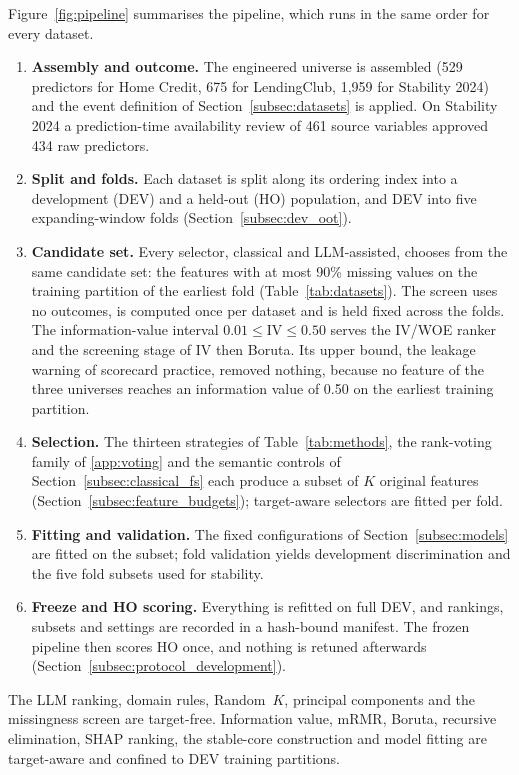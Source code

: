 \documentclass[final,5p,twocolumn]{elsarticle}
\newcommand{\Kfeat}{K}
\begin{document}
Figure~\ref{fig:pipeline} summarises the pipeline, which runs in the same order for every dataset.
\begin{enumerate}
    \item \textbf{Assembly and outcome.} The engineered universe is assembled (529 predictors for Home Credit, 675 for LendingClub, 1,959 for Stability 2024) and the event definition of Section~\ref{subsec:datasets} is applied. On Stability 2024 a prediction-time availability review of 461 source variables approved 434 raw predictors.
    \item \textbf{Split and folds.} Each dataset is split along its ordering index into a development (DEV) and a held-out (HO) population, and DEV into five expanding-window folds (Section~\ref{subsec:dev_oot}).
    \item \textbf{Candidate set.} Every selector, classical and LLM-assisted, chooses from the same candidate set: the features with at most 90\% missing values on the training partition of the earliest fold (Table~\ref{tab:datasets}). The screen uses no outcomes, is computed once per dataset and is held fixed across the folds. The information-value interval $0.01\le\mathrm{IV}\le0.50$ serves the IV/WOE ranker and the screening stage of IV then Boruta. Its upper bound, the leakage warning of scorecard practice, removed nothing, because no feature of the three universes reaches an information value of 0.50 on the earliest training partition.
    \item \textbf{Selection.} The thirteen strategies of Table~\ref{tab:methods}, the rank-voting family of \ref{app:voting} and the semantic controls of Section~\ref{subsec:classical_fs} each produce a subset of $\Kfeat$ original features (Section~\ref{subsec:feature_budgets}); target-aware selectors are fitted per fold.
    \item \textbf{Fitting and validation.} The fixed configurations of Section~\ref{subsec:models} are fitted on the subset; fold validation yields development discrimination and the five fold subsets used for stability.
    \item \textbf{Freeze and HO scoring.} Everything is refitted on full DEV, and rankings, subsets and settings are recorded in a hash-bound manifest. The frozen pipeline then scores HO once, and nothing is retuned afterwards (Section~\ref{subsec:protocol_development}).
\end{enumerate}
The LLM ranking, domain rules, Random~$\Kfeat$, principal components and the missingness screen are target-free. Information value, mRMR, Boruta, recursive elimination, SHAP ranking, the stable-core construction and model fitting are target-aware and confined to DEV training partitions.
\end{document}
